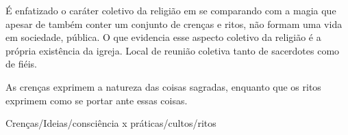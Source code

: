 \documentclass[12pt,a4paper]{article}
\begin{document}
É enfatizado o caráter coletivo da religião em se comparando com a magia que apesar de também conter um conjunto de crenças e ritos, não formam uma vida em sociedade, pública. O que evidencia esse aspecto coletivo da religião é a própria existência da igreja. Local de reunião coletiva tanto de sacerdotes como de fiéis.

As crenças exprimem a natureza das coisas sagradas, enquanto que os ritos exprimem como se portar ante essas coisas.


Crenças/Ideias/consciência x práticas/cultos/ritos
\end{document}
